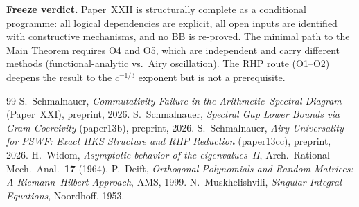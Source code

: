 \documentclass[12pt,a4paper]{amsart}
\theoremstyle{definition}
\begin{document}
\medskip
\textbf{Freeze verdict.}
Paper~XXII is structurally complete as a conditional programme:
all logical dependencies are explicit, all open inputs are
identified with constructive mechanisms, and no BB is re-proved.
The minimal path to the Main Theorem requires O4 and O5,
which are independent and carry different methods
(functional-analytic vs.\ Airy oscillation).
The RHP route (O1--O2) deepens the result to the
$c^{-1/3}$ exponent but is not a prerequisite.

\begin{thebibliography}{99}
S.~Schmalnauer, \textit{Commutativity Failure in the
Arithmetic--Spectral Diagram} (Paper~XXI), preprint, 2026.
S.~Schmalnauer, \textit{Spectral Gap Lower Bounds via
Gram Coercivity} (paper13b), preprint, 2026.
S.~Schmalnauer, \textit{Airy Universality for PSWF:
Exact IIKS Structure and RHP Reduction} (paper13cc), preprint, 2026.
H.~Widom, \textit{Asymptotic behavior of the eigenvalues~II},
Arch.\ Rational Mech.\ Anal.\ \textbf{17} (1964).
P.~Deift, \textit{Orthogonal Polynomials and Random Matrices:
A Riemann--Hilbert Approach}, AMS, 1999.
N.~Muskhelishvili, \textit{Singular Integral Equations},
Noordhoff, 1953.
\end{thebibliography}
\end{document}
